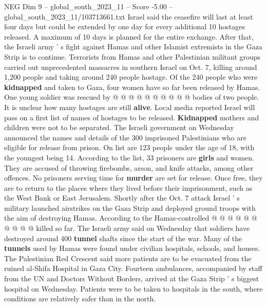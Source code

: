 \begin{textsample}{NEG Dim 9 – global\_south\_2023\_11 – Score -5.00 – global\_south\_2023\_11/103713661.txt}
Israel said the ceasefire will last at least four days but could be extended by one day for every additional 10 hostages released.
A maximum of 10 days is planned for the entire exchange.
After that, the Israeli army ' s fight against Hamas and other Islamist extremists in the Gaza Strip is to continue.
Terrorists from Hamas and other Palestinian militant groups carried out unprecedented massacres in southern Israel on Oct. 7, killing around 1,200 people and taking around 240 people hostage.
Of the 240 people who were \textbf{kidnapped} and taken to Gaza, four women have so far been released by Hamas.
One young soldier was rescued by @ @ @ @ @ @ @ @ @ @ bodies of two people.
It is unclear how many hostages are still \textbf{alive}.
Local media reported Israel will pass on a first list of names of hostages to be released. \textbf{Kidnapped} mothers and children were not to be separated.
The Israeli government on Wednesday announced the names and details of the 300 imprisoned Palestinians who are eligible for release from prison.
On list are 123 people under the age of 18, with the youngest being 14.
According to the list, 33 prisoners are \textbf{girls} and women.
They are accused of throwing firebombs, arson, and knife attacks, among other offences.
No prisoners serving time for \textbf{murder} are set for release.
Once free, they are to return to the places where they lived before their imprisonment, such as the West Bank or East Jerusalem.
Shortly after the Oct. 7 attack Israel ' s military launched airstrikes on the Gaza Strip and deployed ground troops with the aim of destroying Hamas.
According to the Hamas-controlled @ @ @ @ @ @ @ @ @ @ killed so far.
The Israeli army said on Wednesday that soldiers have destroyed around 400 \textbf{tunnel} shafts since the start of the war.
Many of the \textbf{tunnels} used by Hamas were found under civilian hospitals, schools, and houses.
The Palestinian Red Crescent said more patients are to be evacuated from the ruined al-Shifa Hospital in Gaza City.
Fourteen ambulances, accompanied by staff from the UN and Doctors Without Borders, arrived at the Gaza Strip ' s biggest hospital on Wednesday.
Patients were to be taken to hospitals in the south, where conditions are relatively safer than in the north.

\end{textsample}
